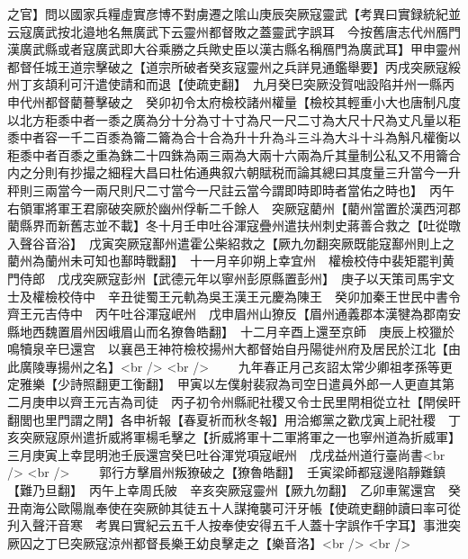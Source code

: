 之官】問以國家兵糧虛實彦博不對虜遷之隂山庚辰突厥寇靈武【考異曰實録統紀並云寇廣武按北邉地名無廣武下云靈州都督敗之蓋靈武字誤耳　今按舊唐志代州鴈門漢廣武縣或者寇廣武即大谷乘勝之兵歟史臣以漢古縣名稱鴈門為廣武耳】甲申靈州都督任城王道宗擊破之【道宗所破者癸亥寇靈州之兵詳見通鑑舉要】丙戌突厥寇綏州丁亥頡利可汗遣使請和而退【使疏吏翻】　九月癸巳突厥没賀咄設陷并州一縣丙申代州都督藺謩擊破之　癸卯初令太府檢校諸州權量【檢校其輕重小大也唐制凡度以北方秬黍中者一黍之廣為分十分為寸十寸為尺一尺二寸為大尺十尺為丈凡量以秬黍中者容一千二百黍為籥二籥為合十合為升十升為斗三斗為大斗十斗為斛凡權衡以秬黍中者百黍之重為銖二十四銖為兩三兩為大兩十六兩為斤其量制公私又不用籥合内之分則有抄撮之細程大昌曰杜佑通典叙六朝賦税而論其總曰其度量三升當今一升秤則三兩當今一兩尺則尺二寸當今一尺註云當今謂即時即時者當佑之時也】　丙午右領軍將軍王君廓破突厥於幽州俘斬二千餘人　突厥寇藺州【藺州當置於漢西河郡藺縣界而新舊志並不載】冬十月壬申吐谷渾寇疊州遣扶州刺史蔣善合救之【吐從暾入聲谷音浴】　戊寅突厥寇鄯州遣霍公柴紹救之【厥九勿翻突厥既能寇鄯州則上之藺州為蘭州未可知也鄯時戰翻】　十一月辛卯朔上幸宜州　權檢校侍中裴矩罷判黄門侍郎　戊戌突厥寇彭州【武德元年以寧州彭原縣置彭州】　庚子以天策司馬宇文士及權檢校侍中　辛丑徙蜀王元軌為吳王漢王元慶為陳王　癸卯加秦王世民中書令齊王元吉侍中　丙午吐谷渾寇岷州　戊申眉州山獠反【眉州通義郡本漢犍為郡南安縣地西魏置眉州因峨眉山而名獠魯皓翻】　十二月辛酉上還至京師　庚辰上校獵於鳴犢泉辛巳還宫　以襄邑王神符檢校揚州大都督始自丹陽徙州府及居民於江北【由此廣陵專揚州之名】<br />
<br />
　　九年春正月己亥詔太常少卿祖孝孫等更定雅樂【少詩照翻更工衡翻】　甲寅以左僕射裴寂為司空日遣員外郎一人更直其第　二月庚申以齊王元吉為司徒　丙子初令州縣祀社稷又令士民里閈相從立社【閈侯旰翻閭也里門謂之閈】各申祈報【春夏祈而秋冬報】用洽鄉黨之歡戊寅上祀社稷　丁亥突厥寇原州遣折威將軍楊毛擊之【折威將軍十二軍將軍之一也寧州道為折威軍】　三月庚寅上幸昆明池壬辰還宫癸巳吐谷渾党項寇岷州　戊戌益州道行臺尚書<br />
<br />
　　郭行方擊眉州叛獠破之【獠魯皓翻】　壬寅梁師都寇邊陷靜難鎮【難乃旦翻】　丙午上幸周氏陂　辛亥突厥寇靈州【厥九勿翻】　乙卯車駕還宫　癸丑南海公歐陽胤奉使在突厥帥其徒五十人謀掩襲可汗牙帳【使疏吏翻帥讀曰率可從刋入聲汗音寒　考異曰實紀云五千人按奉使安得五千人蓋十字誤作千字耳】事泄突厥囚之丁巳突厥寇涼州都督長樂王幼良擊走之【樂音洛】<br />
<br />
